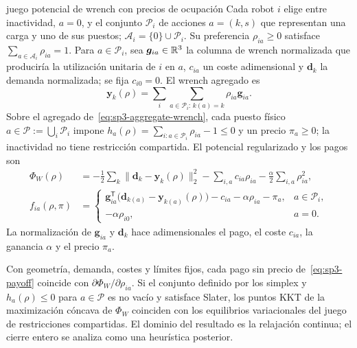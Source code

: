 \begin{contribucion}{juego potencial de wrench con precios de ocupación}
Cada robot $i$ elige entre inactividad, $a=0$, y el conjunto $\mathcal P_i$ de acciones $a=(k,s)$ que representan una carga y uno de sus puestos; $\mathcal A_i=\{0\}\cup\mathcal P_i$. Su preferencia $\rho_{ia}\geq0$ satisface $\sum_{a\in\mathcal A_i}\rho_{ia}=1$. Para $a\in\mathcal P_i$, sea $\boldsymbol g_{ia}\in\mathbb{R}^3$ la columna de wrench normalizada que produciría la utilización unitaria de $i$ en $a$, $c_{ia}$ un coste adimensional y $\boldsymbol d_k$ la demanda normalizada; se fija $c_{i0}=0$. El wrench agregado es
\begin{equation}
\label{eq:sp3-aggregate-wrench}
  \boldsymbol y_k(\rho)=
  \sum_i\sum_{a\in\mathcal P_i:\,k(a)=k}\rho_{ia}\boldsymbol g_{ia}.
\end{equation}
Sobre el agregado de~\eqref{eq:sp3-aggregate-wrench}, cada puesto físico $a\in\mathcal P:=\bigcup_i\mathcal P_i$ impone $h_a(\rho)=\sum_{i:a\in\mathcal P_i}\rho_{ia}-1\leq0$ y un precio $\pi_a\geq0$; la inactividad no tiene restricción compartida. El potencial regularizado y los pagos son
\begin{align}
\label{eq:sp3-potential}
  \Phi_W(\rho)
  &=-\frac12\sum_k\|\boldsymbol d_k-\boldsymbol y_k(\rho)\|_2^2
    -\sum_{i,a}c_{ia}\rho_{ia}
    -\frac{\alpha}{2}\sum_{i,a}\rho_{ia}^2,\\
\label{eq:sp3-payoff}
  f_{ia}(\rho,\pi)
  &=\begin{cases}
    \boldsymbol g_{ia}^{\mathsf T}\bigl(\boldsymbol d_{k(a)}-\boldsymbol y_{k(a)}(\rho)\bigr)-c_{ia}-\alpha\rho_{ia}-\pi_a,
      &a\in\mathcal P_i,\\
    -\alpha\rho_{i0},&a=0.
  \end{cases}
\end{align}
La normalización de $\boldsymbol g_{ia}$ y $\boldsymbol d_k$ hace adimensionales el pago, el coste $c_{ia}$, la ganancia $\alpha$ y el precio $\pi_a$.

\begin{proposicion}
\label{prop:sp3-wrench-potential}
Con geometría, demanda, costes y límites fijos, cada pago sin precio de~\eqref{eq:sp3-payoff} coincide con $\partial\Phi_W/\partial\rho_{ia}$. Si el conjunto definido por los simplex y $h_a(\rho)\leq0$ para $a\in\mathcal P$ es no vacío y satisface Slater, los puntos KKT de la maximización cóncava de $\Phi_W$ coinciden con los equilibrios variacionales del juego de restricciones compartidas. El dominio del resultado es la relajación continua; el cierre entero se analiza como una heurística posterior.
\end{proposicion}
\end{contribucion}

